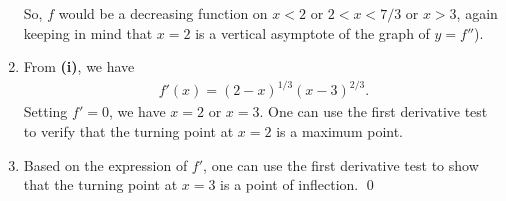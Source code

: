 \documentclass[12pt]{article}
\begin{document}
\begin{enumerate}[label=\textbf{(\roman*)}]
    \newline
    \newline So, $f$ would be a decreasing function on $x<2$ or $2<x<7/3$ or $x>3$, again keeping in mind that $x=2$ is a vertical asymptote of the graph of $y=f''$).
    \item From \textbf{(i)}, we have \begin{align*}
        f'\left(x\right)=\left(2-x\right)^{1/3}\left(x-3\right)^{2/3}.
    \end{align*}
    Setting $f'=0$, we have $x=2$ or $x=3$. One can use the first derivative test to verify that the turning point at $x=2$ is a maximum point.
    \item Based on the expression of $f'$, one can use the first derivative test to show that the turning point at $x=3$ is a point of inflection. \qed 
\end{enumerate}
\end{document}
